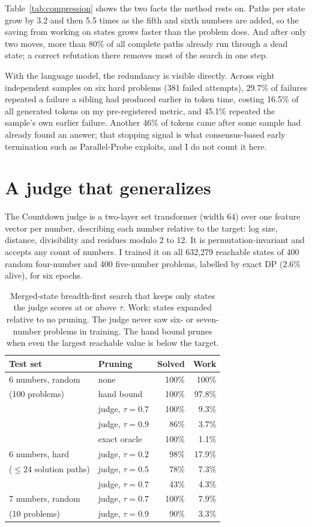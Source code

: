 \documentclass[10pt,twocolumn]{article}
\begin{document}
Table~\ref{tab:compression} shows the two facts the method rests on. Paths per state grow by 3.2 and then 5.5 times as the fifth and sixth numbers are added, so the saving from working on states grows faster than the problem does. And after only two moves, more than 80\% of all complete paths already run through a dead state; a correct refutation there removes most of the search in one step.

With the language model, the redundancy is visible directly. Across eight independent samples on six hard problems (381 failed attempts), 29.7\% of failures repeated a failure a sibling had produced earlier in token time, costing 16.5\% of all generated tokens on my pre-registered metric, and 45.1\% repeated the sample's own earlier failure. Another 46\% of tokens came after some sample had already found an answer; that stopping signal is what consensus-based early termination such as Parallel-Probe \citep{zheng2026probe} exploits, and I do not count it here.

\section{A judge that generalizes}
\label{sec:judge}

The Countdown judge is a two-layer set transformer (width 64) over one feature vector per number, describing each number relative to the target: log size, distance, divisibility and residues modulo 2 to 12. It is permutation-invariant and accepts any count of numbers. I trained it on all 632,279 reachable states of 400 random four-number and 400 five-number problems, labelled by exact DP (2.6\% alive), for six epochs.

\begin{table}[t]
\centering\small
\begin{tabular}{llrr}
\toprule
Test set & Pruning & Solved & Work \\
\midrule
6 numbers, random & none & 100\% & 100\% \\
(100 problems) & hand bound & 100\% & 97.8\% \\
 & judge, $\tau=0.7$ & 100\% & 9.3\% \\
 & judge, $\tau=0.9$ & 86\% & 3.7\% \\
 & exact oracle & 100\% & 1.1\% \\
\midrule
6 numbers, hard & judge, $\tau=0.2$ & 98\% & 17.9\% \\
($\le$24 solution paths) & judge, $\tau=0.5$ & 78\% & 7.3\% \\
 & judge, $\tau=0.7$ & 43\% & 4.3\% \\
\midrule
7 numbers, random & judge, $\tau=0.7$ & 100\% & 7.9\% \\
(10 problems) & judge, $\tau=0.9$ & 90\% & 3.3\% \\
\bottomrule
\end{tabular}
\caption{Merged-state breadth-first search that keeps only states the judge scores at or above $\tau$. Work: states expanded relative to no pruning. The judge never saw six- or seven-number problems in training. The hand bound prunes when even the largest reachable value is below the target.}
\label{tab:judge}
\end{table}
\end{document}

